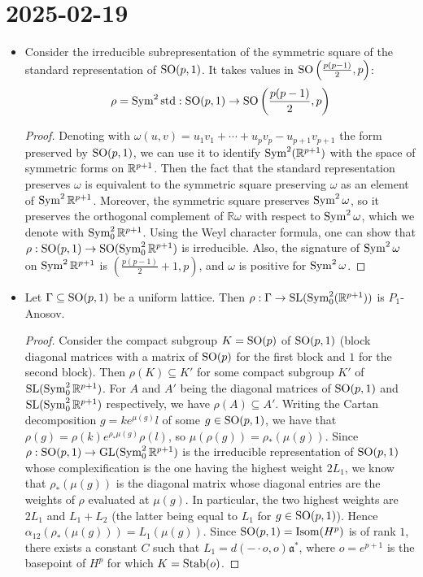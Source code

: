 \documentclass{report}
\begin{document}
\section{2025-02-19}
\begin{itemize}
    \item Consider the irreducible subrepresentation of the symmetric square of the standard representation of $\operatorname{{\mathrm{SO}}}(p,1)$.
    It takes values in $\operatorname{{\mathrm{SO}}}\left(\frac{p(p-1)}{2}, p\right)$:
    \[
    \rho = \operatorname{Sym}^2 \mathrm{std}: \operatorname{{\mathrm{SO}}}(p,1) \to \operatorname{{\mathrm{SO}}}\left(\frac{p(p-1)}{2}, p\right)
    \]
    \begin{proof}
        Denoting with $\omega(u,v) = u_1 v_1 + \cdots + u_p v_p - u_{p+1}v_{p+1}$ the form preserved by $\operatorname{{\mathrm{SO}}}(p,1)$, we can use it to identify $\operatorname{Sym}^2(\mathbb{R}^{p+1})$ with the space of symmetric forms on $\mathbb{R}^{p+1}$.
        Then the fact that the standard representation preserves $\omega$ is equivalent to the symmetric square preserving $\omega$ as an element of $\operatorname{Sym}^2{\mathbb R^{p+1}}$.
        Moreover, the symmetric square preserves $\operatorname{Sym}^2 \omega$, so it preserves the orthogonal complement of $\mathbb R \omega$ with respect to $\operatorname{Sym}^2 \omega$, which we denote with $\operatorname{Sym}^2_0 \mathbb R^{p+1}$.
        Using the Weyl character formula, one can show that $\rho: \operatorname{{\mathrm{SO}}}(p,1) \to \operatorname{{\mathrm{SO}}}(\operatorname{Sym}^2_0 \mathbb R^{p+1})$ is irreducible.
        Also, the signature of $\operatorname{Sym}^2 \omega$ on $\operatorname{Sym}^2 \mathbb R^{p+1}$ is $\left(\frac{p(p-1)}{2} + 1, p\right)$, and $\omega$ is positive for $\operatorname{Sym}^2 \omega$.
    \end{proof}
    \item Let $\Gamma \subseteq \operatorname{{\mathrm{SO}}}(p,1)$ be a uniform lattice. Then
    $\rho: \Gamma \to \operatorname{{\mathrm{SL}}}(\operatorname{Sym}_0^2(\mathbb R^{p+1}))$ is $P_1$-Anosov.
    \begin{proof}
        Consider the compact subgroup $K = \operatorname{{\mathrm{SO}}}(p)$ of $\operatorname{{\mathrm{SO}}}(p,1)$ (block diagonal matrices with a matrix of $\operatorname{{\mathrm{SO}}}(p)$ for the first block and $1$ for the second block).
        Then $\rho(K) \subseteq K'$ for some compact subgroup $K'$ of $\operatorname{{\mathrm{SL}}}(\operatorname{Sym}^2_0 \mathbb R^{p+1})$.
        For $A$ and $A'$ being the diagonal matrices of $\operatorname{{\mathrm{SO}}}(p,1)$ and $\operatorname{{\mathrm{SL}}}(\operatorname{Sym}^2_0 \mathbb R^{p+1})$ respectively, we have $\rho(A) \subseteq A'$.
        Writing the Cartan decomposition $g = k e^{\mu(g)} l$ of some $g \in \operatorname{{\mathrm{SO}}}(p,1)$, we have that $\rho(g) = \rho(k) e^{\rho_* \mu(g)} \rho(l)$, so $\mu(\rho(g)) = \rho_*(\mu(g))$.
        Since $\rho: \operatorname{{\mathrm{SO}}}(p,1) \to \operatorname{{\mathrm{GL}}}(\operatorname{Sym}^2_0 \mathbb R^{p+1})$ is the irreducible representation of $\operatorname{{\mathrm{SO}}}(p,1)$ whose complexification is the one having the highest weight $2L_1$, we know that $\rho_*(\mu(g))$ is the diagonal matrix whose diagonal entries are the weights of $\rho$ evaluated at $\mu(g)$.
        In particular, the two highest weights are $2L_1$ and $L_1 + L_2$ (the latter being equal to $L_1$ for $g \in \operatorname{{\mathrm{SO}}}(p,1)$).
        Hence $\alpha_{12}(\rho_*(\mu(g))) = L_1(\mu(g))$.
        Since $\operatorname{{\mathrm{SO}}}(p,1) = \operatorname{Isom}(H^p)$ is of rank $1$, there exists a constant $C$ such that $L_1 = d(- \cdot o, o) \mathfrak a^*$,
        where $o = e^{p+1}$ is the basepoint of $H^p$ for which $K = \operatorname{Stab}(o)$.
        

\end{proof}
\end{itemize}
\end{document}
